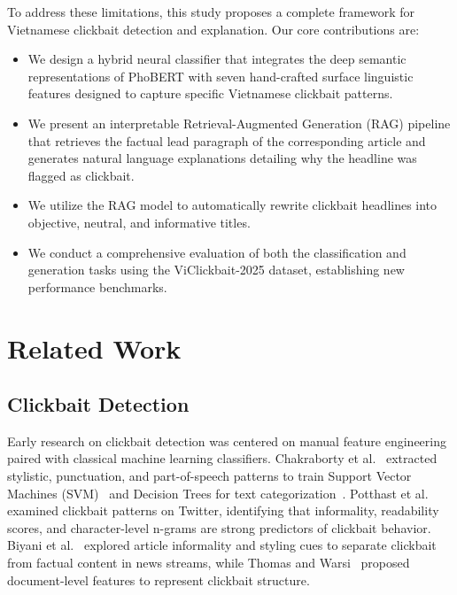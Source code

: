 \documentclass[conference]{IEEEtran}
\begin{document}
To address these limitations, this study proposes a complete framework for Vietnamese clickbait detection and explanation. Our core contributions are:
\begin{itemize}
    \item We design a hybrid neural classifier that integrates the deep semantic representations of PhoBERT with seven hand-crafted surface linguistic features designed to capture specific Vietnamese clickbait patterns.
    \item We present an interpretable Retrieval-Augmented Generation (RAG) pipeline that retrieves the factual lead paragraph of the corresponding article and generates natural language explanations detailing why the headline was flagged as clickbait.
    \item We utilize the RAG model to automatically rewrite clickbait headlines into objective, neutral, and informative titles.
    \item We conduct a comprehensive evaluation of both the classification and generation tasks using the ViClickbait-2025 dataset, establishing new performance benchmarks.
\end{itemize}

\section{Related Work}
\subsection{Clickbait Detection}
Early research on clickbait detection was centered on manual feature engineering paired with classical machine learning classifiers. Chakraborty et al.~\cite{chakraborty2016stop} extracted stylistic, punctuation, and part-of-speech patterns to train Support Vector Machines (SVM)~\cite{cortes1995svm} and Decision Trees for text categorization~\cite{joachims1998text}. Potthast et al.~\cite{potthast2016clickbait, potthast2018crowdsourcing} examined clickbait patterns on Twitter, identifying that informality, readability scores, and character-level n-grams are strong predictors of clickbait behavior. Biyani et al.~\cite{biyani2016clickbait} explored article informality and styling cues to separate clickbait from factual content in news streams, while Thomas and Warsi~\cite{thomas2017clickbait} proposed document-level features to represent clickbait structure.
\end{document}
